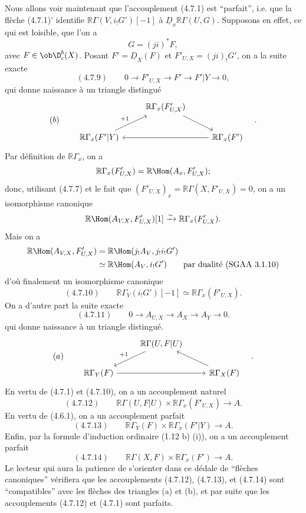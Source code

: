 Nous allons voir maintenant que l'accouplement (4.7.1) est ``parfait'', i.e. que la flèche (4.7.1)' identifie $\mathbb{R}\Gamma(V,i_!G')[-1]$ à $\underline{D}_x\mathbb{R}\Gamma(U,G)$. Supposons en effet, ce qui est loisible, que l'on a
\[
G=(ji)^*F,
\]
avec $F\in\ob\D_c^b(X)$. Posant $F'=\underline{D}_X(F)$ et $F'_{U,X}=(ji)_!G'$, on a la suite exacte
\[
(4.7.9)\qquad 0\longrightarrow F'_{U,X}\longrightarrow F'\longrightarrow F'|Y\longrightarrow0,
\]
qui donne naissance à un triangle distingué
\[
(b)\qquad
\begin{tikzcd}
& \mathbb{R}\Gamma_x(F'_{U,X}) \arrow[dr] \\
\mathbb{R}\Gamma_x(F'|Y) \arrow[ur,"{+1}"] && \mathbb{R}\Gamma_x(F') \arrow[ll]
\end{tikzcd}\quad .
\]
Par définition de $\mathbb{R}\Gamma_x$, on a
\[
\mathbb{R}\Gamma_x(F'_{U,X})=\mathbb{R}\Hom(A_x,F'_{U,X});
\]
donc, utilisant (4.7.7) et le fait que $(F'_{U,X})_x=\mathbb{R}\Gamma(X,F'_{U,X})=0$, on a un isomorphisme canonique
\[
\mathbb{R}\Hom(A_{V,X},F'_{U,X})[1]\xrightarrow{\sim}\mathbb{R}\Gamma_x(F'_{U,X}).
\]
Mais on a
\[
\begin{aligned}
\mathbb{R}\Hom(A_{V,X},F'_{U,X})&=\mathbb{R}\Hom(j_!A_V,j_!i_!G')\\
&\simeq\mathbb{R}\Hom(A_V,i_!G')\qquad\text{par dualité (SGAA~3.1.10)}
\end{aligned}
\]
d'où finalement un
isomorphisme canonique
\[
(4.7.10)\qquad \mathbb{R}\Gamma_V(i_!G')[-1]\simeq\mathbb{R}\Gamma_x(F'_{U,X}).
\]
On a d'autre part la suite exacte
\[
(4.7.11)\qquad 0\longrightarrow A_{U,X}\longrightarrow A_X\longrightarrow A_Y\longrightarrow0.
\]
qui donne naissance à un triangle distingué.
\[
(a)\qquad
\begin{tikzcd}
& \mathbb{R}\Gamma(U,F|U) \arrow[dl,"{+1}"'] \\
\mathbb{R}\Gamma_Y(F) \arrow[rr] && \mathbb{R}\Gamma_X(F) \arrow[ul]
\end{tikzcd}\quad .
\]
En vertu de (4.7.1) et (4.7.10), on a un accouplement naturel
\[
(4.7.12)\qquad \mathbb{R}\Gamma(U,F|U)\times\mathbb{R}\Gamma_x(F'_{U,X})\longrightarrow A.
\]
En vertu de (4.6.1), on a un accouplement parfait
\[
(4.7.13)\qquad \mathbb{R}\Gamma_Y(F)\times\mathbb{R}\Gamma_x(F'|Y)\longrightarrow A.
\]
Enfin, par la formule d'induction ordinaire (1.12 b) (i)), on a un accouplement parfait
\[
(4.7.14)\qquad \mathbb{R}\Gamma(X,F)\times\mathbb{R}\Gamma_x(F')\longrightarrow A.
\]
Le lecteur qui aura la patience de s'orienter dans ce dédale de ``flèches canoniques'' vérifiera que les accouplements (4.7.12), (4.7.13), et (4.7.14) sont ``compatibles'' avec les flèches des triangles (a) et (b), et par suite que les accouplements (4.7.12) et (4.7.1) sont parfaits.

